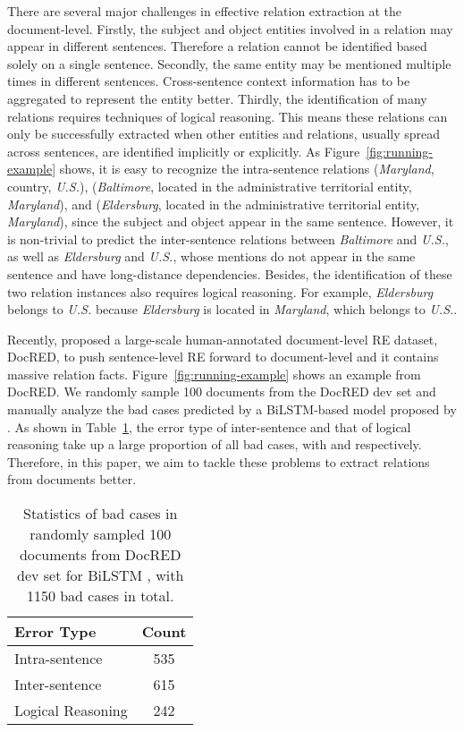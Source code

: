 \documentclass[11pt,a4paper]{article}
\begin{document}
There are several major challenges in effective relation extraction at the document-level.
Firstly, the subject and object entities involved in a relation may appear in different sentences. Therefore a relation cannot be identified based solely on a single sentence.
Secondly, the same entity may be mentioned multiple times in different sentences. Cross-sentence context information has to be aggregated to represent the entity better.
Thirdly, the identification of many relations requires techniques of logical reasoning. This means these relations can only be successfully extracted when other entities and relations, usually spread across sentences, are identified implicitly or explicitly.  
As Figure~\ref{fig:running-example} shows, it is easy to recognize the intra-sentence relations (\textit{Maryland}, country, \textit{U.S.}), (\textit{Baltimore}, located in the administrative territorial entity, \textit{Maryland}), and (\textit{Eldersburg}, located in the administrative territorial entity, \textit{Maryland}), since the subject and object appear in the same sentence.
However, it is non-trivial to predict the inter-sentence relations between \textit{Baltimore} and \textit{U.S.}, as well as \textit{Eldersburg} and \textit{U.S.}, whose mentions do not appear in the same sentence and have long-distance dependencies.
Besides, the identification of these two relation instances also requires logical reasoning. For example, \textit{Eldersburg} belongs to \textit{U.S.} because \textit{Eldersburg} is located in \textit{Maryland}, which belongs to \textit{U.S.}.

Recently, \citet{yao-etal-19-docred} proposed a large-scale human-annotated document-level RE dataset, DocRED, to push sentence-level RE forward to document-level and it contains massive relation facts. Figure~\ref{fig:running-example} shows an example from DocRED. 
We randomly sample 100 documents from the DocRED dev set and manually analyze the bad cases predicted by a BiLSTM-based model proposed by \citet{yao-etal-19-docred}. As shown in Table~\ref{table:bad-cases}, the error type of inter-sentence and that of logical reasoning take up a large proportion of all bad cases, with  and  respectively.
Therefore, in this paper, we aim to tackle these problems to extract relations from documents better.

\begin{table}
\centering
\begin{tabular}{lc}
\hline
Error Type & Count \\
\hline
Intra-sentence & 535 \\
Inter-sentence & 615 \\
\hline
\hline
Logical Reasoning & 242 \\
\hline
\end{tabular}
\caption{Statistics of bad cases in randomly sampled 100 documents from DocRED dev set for BiLSTM \citep{yao-etal-19-docred}, with 1150 bad cases in total.}
\label{table:bad-cases}
\end{table}
\end{document}
